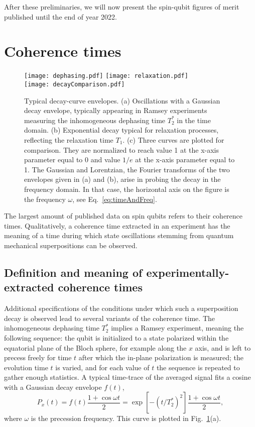 \documentclass[aps, prx, showpacs, twocolumn, superscriptaddress, notitlepage, longbibliography, floatfix, nofootinbib]{revtex4-2}
\newcommand{\recheck}[1]{{#1}}
\newcommand{\separate}[1]
{
 #1
}
\begin{document}
\separate{
After these preliminaries, we will now present the spin-qubit figures of merit published until \recheck{the end of year 2022}.
}

\section{Coherence times}

\label{sec:coherence}

\begin{figure}
\centering
  \texttt{[image: dephasing.pdf]} \hfill
  \texttt{[image: relaxation.pdf]} \hfill\\
  \texttt{[image: decayComparison.pdf]} \hfill
  \caption{\label{fig:envelopes} Typical decay-curve envelopes. (a) Oscillations with a Gaussian decay envelope, typically appearing in Ramsey experiments measuring the inhomogeneous dephasing time $T_2^*$ in the time domain. (b) Exponential decay typical for relaxation processes, reflecting the relaxation time $T_1$. (c) Three curves are plotted for comparison. They are normalized to reach value 1 at the x-axis parameter equal to 0 and value $1/e$ at the x-axis parameter equal to 1. The Gaussian and Lorentzian, the Fourier transforms of the two envelopes given in (a) and (b), arise in probing the decay in the frequency domain. In that case, the horizontal axis on the figure is the frequency $\omega$, see Eq.~\eqref{eq:timeAndFreq}.}
\end{figure}

The largest amount of published data on spin qubits refers to their coherence times. Qualitatively, a coherence time extracted in an experiment has the meaning of a time during which state oscillations stemming from quantum mechanical superpositions can be observed. 

\subsection{Definition and meaning of experimentally-extracted coherence times}

Additional specifications of the conditions under which such a superposition decay is observed lead to several variants of the coherence time. The inhomogeneous dephasing time $T_2^*$ implies a Ramsey experiment, meaning the following sequence: the qubit is initialized to a state polarized within the equatorial plane of the Bloch sphere, for example along the $x$ axis, and is left to precess freely for time $t$ after which the in-plane polarization is measured; the evolution time $t$ is varied, and for each value of $t$ the sequence is repeated to gather enough statistics. A typical time-trace of the averaged signal fits a cosine with a Gaussian decay envelope $f(t)$,
\begin{equation}
P_x(t) = f(t)\frac{1+\cos \omega t}{2} = \exp\left[-(t / T_2^*)^2\right] \frac{1+\cos \omega t}{2},
\label{eq:dephasing}
\end{equation}
where $\omega$ is the precession frequency. This curve is plotted in Fig.~\ref{fig:envelopes}(a). 
\end{document}
